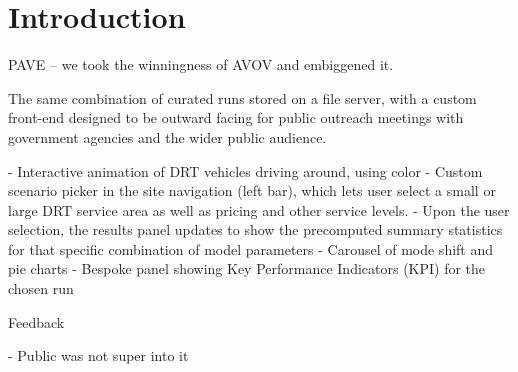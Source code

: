 \section{Introduction}
\label{pave-intro}

PAVE -- we took the winningness of AVOV and embiggened it.

The same combination of curated runs stored on a file server, with a custom front-end designed to be outward facing for public outreach meetings with government agencies and the wider public audience.

- Interactive animation of DRT vehicles driving around, using color
- Custom scenario picker in the site navigation (left bar), which lets user select a small or large DRT service area as well as pricing and other service levels.
- Upon the user selection, the results panel updates to show the precomputed summary statistics for that specific combination of model parameters
- Carousel of mode shift and pie charts
- Bespoke panel showing Key Performance Indicators (KPI) for the chosen run


Feedback

- Public was not super into it






